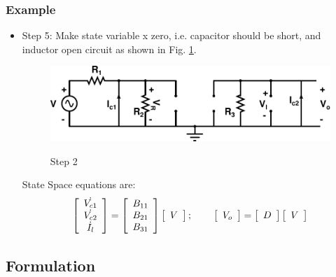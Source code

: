 \documentclass{beamer}
\begin{document}
\begin{frame}
\frametitle{Example}
\begin{small}

\begin{itemize}
\item Step 5: Make state variable x zero, i.e. capacitor should be short, and inductor open circuit as shown in Fig. \ref{transb}.

\begin{figure}[h!]
\centering
{\label{method}\includegraphics[totalheight=.2\textheight,width=.6\textwidth]{images/Transc}}
\caption{Step 2}
\label{transb}
\end{figure} 

State Space equations are:
\[ \left[ \begin{array}{cc}
\dot{V_{c1}} \\
\dot{V_{c2}} \\
\dot{I_l}
\end{array} \right]
=
\left[ \begin{array}{c}
B_{11} \\
B_{21} \\
B_{31}
\end{array} \right]
%
\left[ \begin{array}{c}
{V}
\end{array} \right]; \hspace{0.3in}
 \left[ \begin{array}{c}
{V_o} 
\end{array} \right]
=
\left[ \begin{array}{cc}
D
\end{array} \right]
%
\left[ \begin{array}{cc}
{V}
\end{array} \right]
\]
\end{itemize}
\end{small}
\end{frame}

\subsection*{Formulation}
\end{document}
